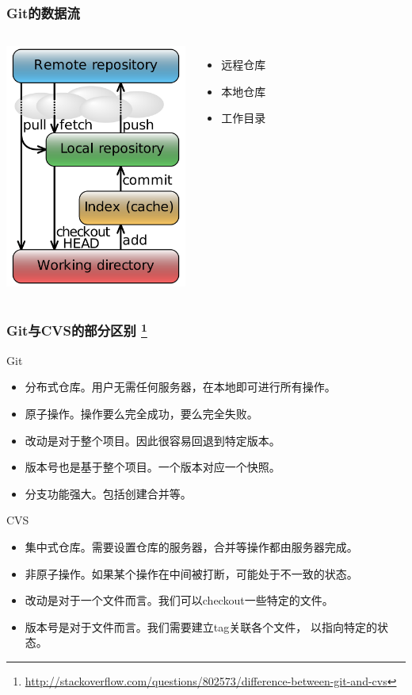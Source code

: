 \begin{frame}
    \frametitle{Git的数据流}
    \begin{columns}
        \column{6.0cm}
            \includegraphics[height=8cm,keepaspectratio]{data/GitDataFlowSimplified.png}
            \label{pic:DataFlow}
        \column{4.5cm}
            \begin{itemize}
                \item 远程仓库
                \item 本地仓库
                \item 工作目录
            \end{itemize}
    \end{columns}
\end{frame}

\begin{frame}
    \frametitle{Git与CVS的部分区别
        \footnote{\scriptsize \url{http://stackoverflow.com/questions/802573/difference-between-git-and-cvs}}}
    \begin{block}{Git}
        \begin{itemize}
            \item 分布式仓库。用户无需任何服务器，在本地即可进行所有操作。
            \item 原子操作。操作要么完全成功，要么完全失败。
            \item 改动是对于整个项目。因此很容易回退到特定版本。
            \item 版本号也是基于整个项目。一个版本对应一个快照。
            \item 分支功能强大。包括创建合并等。
        \end{itemize}
    \end{block}
    \begin{block}{CVS}
        \begin{itemize}
            \item 集中式仓库。需要设置仓库的服务器，合并等操作都由服务器完成。
            \item 非原子操作。如果某个操作在中间被打断，可能处于不一致的状态。
            \item 改动是对于一个文件而言。我们可以checkout一些特定的文件。
            \item 版本号是对于文件而言。我们需要建立tag关联各个文件，
                  以指向特定的状态。
        \end{itemize}
    \end{block}
\end{frame}

